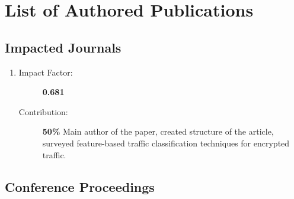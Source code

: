 \chapter{List of Authored Publications}


\section{Impacted Journals}

\begin{enumerate}
	\item {}
	\begin{description}
      \item[Impact Factor:] \textbf{0.681}
      \item[Contribution:] \textbf{50\%} Main author of the paper, created structure of the article, surveyed feature-based traffic classification techniques for encrypted traffic.
    \end{description}

\end{enumerate}

\section{Conference Proceedings}

